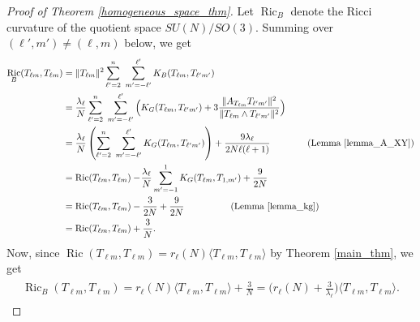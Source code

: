 \documentclass[11pt]{amsart}
\numberwithin{equation}{section}
\theoremstyle{definition}
\DeclareMathOperator{\Ric}{Ric}
\begin{document}
\begin{proof}[Proof of Theorem \ref{homogeneous_space_thm}] 
Let $\Ric_B$ denote the Ricci curvature of the quotient space $SU(N)/SO(3)$. Summing over $(\ell', m') \neq (\ell, m)$ below, we get 
\begin{gather*}
\begin{split}
\Ric_B(T_{\ell m}, T_{\ell m}) &= \|T_{\ell m}\|^2\sum\limits_{\ell' = 2}^n~\sum\limits_{m' = -\ell'}^{\ell'} K_B(T_{\ell m}, T_{\ell' m'}) \\
&= \frac{\lambda_{\ell}}{N}\sum\limits_{\ell' = 2}^n~\sum\limits_{m' = -\ell'}^{\ell'} \Big(K_G(T_{\ell m}, T_{\ell' m'}) + 3\frac{\|A_{T_{\ell m}}T_{\ell' m'}\|^2}{\|T_{\ell m} \wedge T_{\ell'm'}\|^2}\Big) \\
&= \frac{\lambda_{\ell}}{N}\left( \sum\limits_{\ell' = 2}^n~\sum\limits_{m' = -\ell'}^{\ell'} K_G(T_{\ell m}, T_{\ell' m'})\right) + \frac{9\lambda_{\ell}}{2N\ell(\ell+1)} \qquad\qquad (\text{Lemma \ref{lemma_A_XY}}) \\
&= \Ric(T_{\ell m}, T_{\ell m}) -\!\frac{\lambda_{\ell}}{N}\sum_{m' = -1}^1 K_G(T_{\ell m}, T_{1, m'}) + \frac{9}{2N} \\
&= \Ric(T_{\ell m}, T_{\ell m}) -\frac{3}{2N} + \frac{9}{2N} \qquad\qquad\quad (\text{Lemma \ref{lemma_kg}}) \\
&= \Ric(T_{\ell m}, T_{\ell m}) + \frac{3}{N}.
\end{split}
\end{gather*}
Now, since $\Ric(T_{\ell m}, T_{\ell m}) = r_{\ell}(N)\langle T_{\ell m}, T_{\ell m}\rangle$ by Theorem \ref{main_thm}, we get
\begin{gather*}
\begin{split}
\Ric_B(T_{\ell m}, T_{\ell m}) = r_{\ell}(N)\langle T_{\ell m}, T_{\ell m} \rangle + \frac{3}{N} = \bigg(r_{\ell}(N) + \frac{3}{\lambda_{\ell}}\bigg)\langle T_{\ell m}, T_{\ell m} \rangle.
\end{split}
\end{gather*}


\end{proof}


































\end{document}
